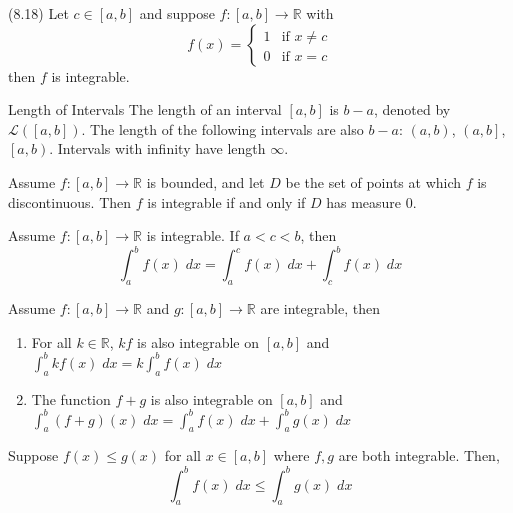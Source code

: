 \documentclass[12pt]{article}
\begin{document}
\begin{porism}{(8.18)}{}
    Let $ c \in \left[ a, b \right] $ and suppose $ f : \left[ a, b \right] \to \mathbb{R} $ with
    \[ f \left( x \right) = \begin{cases}
        1 & \text{if } x \neq c \\
        0 & \text{if } x = c
    \end{cases} \]
    then $ f $ is integrable.
\end{porism}
\begin{definition}{Length of Intervals}{}
    The length of an interval $ \left[ a, b \right] $ is $ b - a $, denoted by $ \mathcal{L} \left( \left[ a, b \right] \right) $.
    \medskip
    \newline
    The length of the following intervals are also $ b - a $: $ \left( a, b \right) $, $ \left( a, b \right] $, $ \left[ a, b \right) $.
    \medskip
    \newline
    Intervals with infinity have length $ \infty $.
\end{definition}
\begin{theorem}{}{}
    Assume $ f : \left[ a, b \right] \to \mathbb{R} $ is bounded, and let $ D $ be the set of points at which $ f $ is discontinuous. Then $ f $ is integrable if and only if $ D $ has measure 0.
\end{theorem}
\begin{proposition}{}{}
    Assume $ f : \left[ a, b \right] \to \mathbb{R} $ is integrable. If $ a < c < b $, then
    \[ \int_a^b f \left( x \right) \; dx = \int_a^c f \left( x \right) \; dx + \int_c^b f \left( x \right) \; dx \]
\end{proposition}
\begin{proposition}{}{}
    Assume $ f : \left[ a, b \right] \to \mathbb{R} $ and $ g : \left[ a, b \right] \to \mathbb{R} $ are integrable, then
    \begin{enumerate}
        \item For all $ k \in \mathbb{R} $, $ kf $ is also integrable on $ \left[ a, b \right] $ and $ \int_a^b k f \left( x \right) \; dx = k \int_a^b f \left( x \right) \; dx $
        \item The function $ f + g $ is also integrable on $ \left[ a, b \right] $ and $ \int_a^b \left( f + g \right) \left( x \right) \; dx = \int_a^b f \left( x \right) \; dx + \int_a^b g \left( x \right) \; dx $
    \end{enumerate}
\end{proposition}
\begin{corollary}{}{}
    Suppose $ f \left( x \right) \leq g \left( x \right) $ for all $ x \in \left[ a, b \right] $ where $ f, g $ are both integrable. Then,
    \[ \int_a^b f \left( x \right) \; dx \leq \int_a^b g \left( x \right) \; dx \]
\end{corollary}
\end{document}
